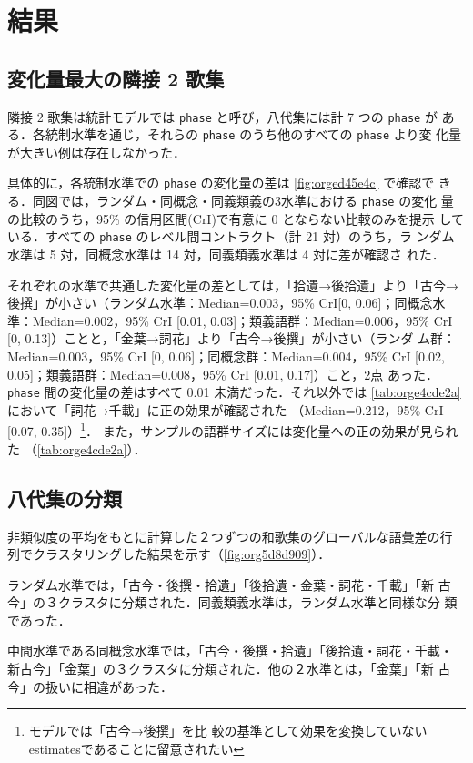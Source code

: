 \documentclass[submit]{ipsj}
\renewcommand{\ref}{\cref}
\begin{document}
\section{結果\label{org59232b0}}
\label{sec:org565b633}
\subsection{変化量最大の隣接 2 歌集\label{orgeb286e6}}
\label{sec:orgb35fd9f}
隣接 2 歌集は統計モデルでは \texttt{phase} と呼び，八代集には計 7 つの \texttt{phase} が
ある．各統制水準を通じ，それらの \texttt{phase} のうち他のすべての \texttt{phase} より変
化量が大きい例は存在しなかった．

具体的に，各統制水準での \texttt{phase} の変化量の差は \ref{fig:orged45e4c} で確認で
きる．同図では，ランダム・同概念・同義類義の3水準における \texttt{phase} の変化
量の比較のうち，95\% の信用区間(CrI)で有意に 0 とならない比較のみを提示
している．すべての \texttt{phase} のレベル間コントラクト（計 21 対）のうち，ラ
ンダム水準は 5 対，同概念水準は 14 対，同義類義水準は 4 対に差が確認さ
れた．

それぞれの水準で共通した変化量の差としては，「拾遺→後拾遺」より「古今→
後撰」が小さい（ランダム水準：Median=0.003，95\% CrI[0, 0.06]；同概念水
準：Median=0.002，95\% CrI [0.01, 0.03]；類義語群：Median=0.006，95\%
CrI [0, 0.13]）ことと，「金葉→詞花」より「古今→後撰」が小さい（ランダ
ム群：Median=0.003，95\% CrI [0, 0.06]；同概念群：Median=0.004，95\% CrI
{[}0.02, 0.05]；類義語群：Median=0.008，95\% CrI [0.01, 0.17]）こと，2点
あった． \texttt{phase} 間の変化量の差はすべて 0.01 未満だった．それ以外では
\ref{tab:orge4cde2a} において「詞花→千載」に正の効果が確認された
（Median=0.212，95\% CrI [0.07, 0.35]）\footnote{モデルでは「古今→後撰」を比
較の基準として効果を変換していないestimatesであることに留意されたい}．
また，サンプルの語群サイズには変化量への正の効果が見られた
（\ref{tab:orge4cde2a}）．
\subsection{八代集の分類\label{org1c6c39c}}
\label{sec:orgc1b0ad9}
非類似度の平均をもとに計算した２つずつの和歌集のグローバルな語彙差の行
列でクラスタリングした結果を示す（\ref{fig:org5d8d909}）．

ランダム水準では，「古今・後撰・拾遺」「後拾遺・金葉・詞花・千載」「新
古今」の３クラスタに分類された．同義類義水準は，ランダム水準と同様な分
類であった．

中間水準である同概念水準では，「古今・後撰・拾遺」「後拾遺・詞花・千載・
新古今」「金葉」の３クラスタに分類された．他の２水準とは，「金葉」「新
古今」の扱いに相違があった．
\end{document}
